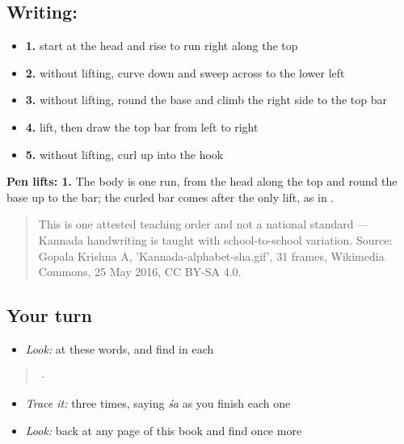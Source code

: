 \subsection*{Writing: }

\begin{itemize}
\raggedright
  \item \textbf{1.} start at the head and rise to run right along the top
  \item \textbf{2.} without lifting, curve down and sweep across to the lower left
  \item \textbf{3.} without lifting, round the base and climb the right side to the top bar
  \item \textbf{4.} lift, then draw the top bar from left to right
  \item \textbf{5.} without lifting, curl up into the hook
\end{itemize}

\textbf{Pen lifts: 1.} The body is one run, from the head along the top and round the base up to the bar; the curled bar comes after the only lift, as in .

\begin{quote}
This is one attested teaching order and not a national standard — Kannada handwriting is taught with school-to-school variation. Source: Gopala Krishna A, 'Kannada-alphabet-sha.gif', 31 frames, Wikimedia Commons, 25 May 2016, CC BY-SA 4.0.
\end{quote}

\subsection*{Your turn}
\begin{itemize}
\raggedright
  \item \emph{Look:} at these words, and find  in each
\end{itemize}

\begin{quote}
   ·  
\end{quote}

\begin{itemize}
\raggedright
  \item \emph{Trace it:}  three times, saying \emph{śa} as you finish each one
  \item \emph{Look:} back at any page of this book and find  once more
\end{itemize}

